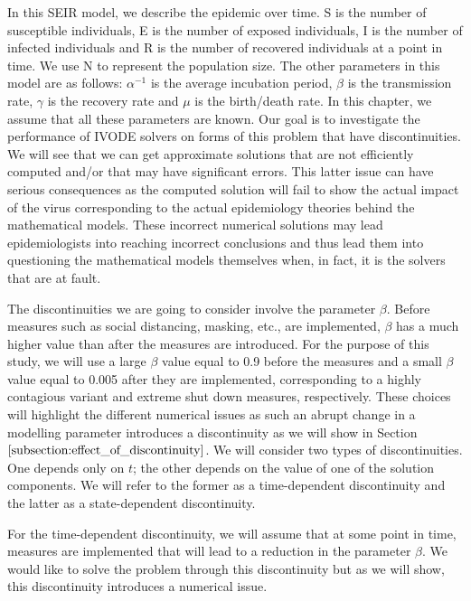 In this SEIR model, we describe the epidemic over time. S is the number of susceptible individuals, E is the number of exposed individuals, I is the number of infected individuals and R is the number of recovered individuals at a point in time. We use N to represent the population size.
The other parameters in this model are as follows: $\alpha^{-1}$ is the average incubation period, $\beta$ is the transmission rate, $\gamma$ is the recovery rate and $\mu$ is the birth/death rate. In this chapter, we assume that all these parameters are known. Our goal is to investigate the performance of IVODE solvers on forms of this problem that have discontinuities. We will see that we can get approximate solutions that are not efficiently computed and/or that may have significant errors. This latter issue can have serious consequences as the computed solution will fail to show the actual impact of the virus corresponding to the actual epidemiology theories behind the mathematical models. These incorrect numerical solutions may lead epidemiologists into reaching incorrect conclusions and thus lead them into questioning the mathematical models themselves when, in fact, it is the solvers that are at fault.

The discontinuities we are going to consider involve the parameter $\beta$.
Before measures such as social distancing, masking, etc., are implemented, $\beta$ has a much higher value than after the measures are introduced. For the purpose of this study, we will use a large $\beta$ value equal to 0.9 before the measures and a small $\beta$ value equal to 0.005 after they are implemented, corresponding to a highly contagious variant and extreme shut down measures, respectively. These choices will highlight the different numerical issues as such an abrupt change in a modelling parameter introduces a discontinuity as we will show in Section $\ref{subsection:effect_of_discontinuity}$. We will consider two types of discontinuities. One depends only on $t$; the other depends on the value of one of the solution components. We will refer to the former as a time-dependent discontinuity and the latter as a state-dependent discontinuity.

For the time-dependent discontinuity, we will assume that at some point in time, measures are implemented that will lead to a reduction in the parameter $\beta$. We would like to solve the problem through this discontinuity but as we will show, this discontinuity introduces a numerical issue.

